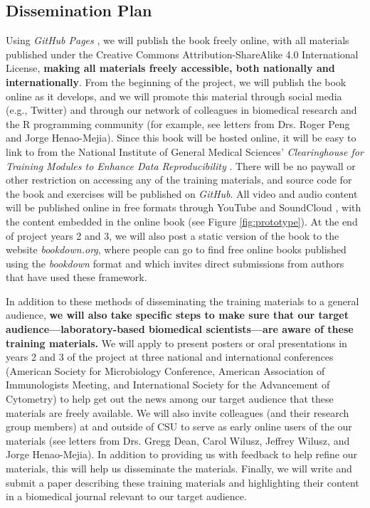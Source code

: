 \documentclass[pdftex,english,11.5pt,parskip=half]{scrartcl}
\begin{document}


\subsection{Dissemination Plan}

Using \textit{GitHub Pages} \cite{gitpages}, we will publish the book freely online, with all materials published under the Creative Commons Attribution-ShareAlike 4.0 International License, \textbf{making all materials freely accessible, both nationally and internationally}. From the beginning of the project, we will publish the book online as it develops, and we will promote this material through social media (e.g., Twitter) and through our network of colleagues in biomedical research and the R programming community (for example, see letters from Drs. Roger Peng and Jorge Henao-Mejia). Since this book will be hosted online, it will be easy to link to from the National Institute of General Medical Sciences' \textit{Clearinghouse for Training Modules to Enhance Data Reproducibility} \cite{clearinghouse}. There will be no paywall or other restriction on accessing any of the training materials, and source code for the book and exercises will be published on \textit{GitHub}. All video and audio content will be published online in free formats through YouTube \cite{youtube} and SoundCloud \cite{soundcloud}, with the content embedded in the online book (see Figure \ref*{fig:prototype}). At the end of project years 2 and 3, we will also post a static version of the book to the website \textit{bookdown.org}, where people can go to find free online books published using the \textit{bookdown} format and which invites direct submissions from authors that have used these framework. 

In addition to these methods of disseminating the training materials to a general audience, \textbf{we will also take specific steps to make sure that our target audience---laboratory-based biomedical scientists---are aware of these training materials.} We will apply to present posters or oral presentations in years 2 and 3 of the project at three national and international conferences (American Society for Microbiology Conference, American Association of Immunologists Meeting, and International Society for the Advancement of Cytometry) to help get out the news among our target audience that these materials are freely available. We will also invite colleagues (and their research group members) at and outside of CSU to serve as early online users of the our materials (see letters from Drs. Gregg Dean, Carol Wilusz, Jeffrey Wilusz, and Jorge Henao-Mejia). In addition to providing us with feedback to help refine our materials, this will help us disseminate the materials. Finally, we will write and submit a paper describing these training materials and highlighting their content in a biomedical journal relevant to our target audience.
\end{document}
